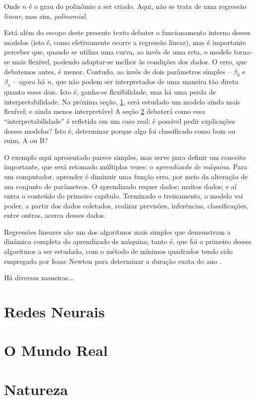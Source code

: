 Onde $n$ é o grau do polinômio a ser criado.
Aqui, não se trata de uma regressão \textit{linear}, mas sim, \textit{polinomial}.

Está além do escopo deste presente texto debater o funcionamento interno desses modelos (isto é, como efetivamente ocorre a regressão linear), mas é importante perceber que, quando se utiliza uma curva, ao invés de uma reta, o modelo torna-se mais flexível, podendo adaptar-se melhor às condições dos dados.
O erro, que debatemos antes, é menor.
Contudo, ao invés de dois parâmetros simples -- $\beta_0$ e $\beta_1$ -- agora há $n$, que não podem ser interpretados de uma maneira tão direta quanto esses dois.
Isto é, ganha-se flexibilidade, mas há uma perda de interpretabilidade.
Na próxima seção, \ref{sec:2:redes-neurais}, será estudado um modelo ainda mais flexível; e ainda menos interpretável
A seção \ref{sec:2:exemplo-real} debaterá como essa ``interpretabilidade'' é refletida em um caso real: é possível pedir explicações desses modelos?
Isto é, determinar porque algo foi classificado como bom ou ruim, A ou B?

O exemplo aqui apresentado parece simples, mas serve para definir um conceito importante, que será retomado múltiplas vezes: o \textit{aprendizado de máquina}.
Para um computador, aprender é diminuir uma função erro, por meio da alteração de um conjunto de parâmetros.
O aprendizado requer dados; muitos dados; e aí entra o conteúdo do primeiro capítulo.
Terminado o treinamento, o modelo vai poder, a partir dos dados coletados, realizar previsões, inferências, classificações, entre outros, acerca desses dados.

Regressões lineares são um dos algoritmos mais simples que demonstram a dinâmica completa do aprendizado de máquina; tanto é, que foi o primeiro desses algoritmos a ser estudado, com o método de mínimos quadrados tendo sido empregado por Isaac Newton para determinar a duração exata do ano \cite{belenkiy_groping_2016}.

Há diversas maneiras...


\section{Redes Neurais}\label{sec:2:redes-neurais}
\section{O Mundo Real}\label{sec:2:exemplo-real}
\section{Natureza}
